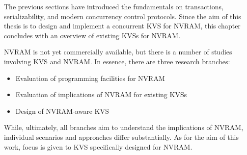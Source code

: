 
The previous sections have introduced the fundamentals on transactions,
serializability, and modern concurrency control protocols.  Since the aim of
this thesis is to design and implement a concurrent \ac{KVS} for \ac{NVRAM},
this chapter concludes with an overview of existing \acp{KVS} for \ac{NVRAM}.

\ac{NVRAM} is not yet commercially available, but there is a number of studies
involving \ac{KVS} and \ac{NVRAM}. In essence, there are three research
branches:

\begin{itemize}
    \item Evaluation of programming facilities for \ac{NVRAM}
    \item Evaluation of implications of \ac{NVRAM} for existing \acp{KVS}
    \item Design of \ac{NVRAM}-aware \ac{KVS}
\end{itemize}

While, ultimately, all branches aim to understand the implications of
\ac{NVRAM}, individual scenarios and approaches differ substantially. As for the
aim of this work, focus is given to \ac{KVS} specifically designed for
\ac{NVRAM}.



